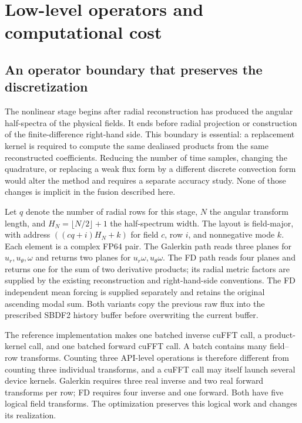 \section{Low-level operators and computational cost}
\label{sec:operators}

\subsection{An operator boundary that preserves the discretization}

The nonlinear stage begins after radial reconstruction has produced the angular half-spectra of the physical fields. It ends before radial projection or construction of the finite-difference right-hand side. This boundary is essential: a replacement kernel is required to compute the same dealiased products from the same reconstructed coefficients. Reducing the number of time samples, changing the quadrature, or replacing a weak flux form by a different discrete convection form would alter the method and requires a separate accuracy study. None of those changes is implicit in the fusion described here.

Let \(q\) denote the number of radial rows for this stage, \(N\) the angular transform length, and \(H_N=\lfloor N/2\rfloor+1\) the half-spectrum width. The layout is field-major, with address \(((c q+i)H_N+k)\) for field \(c\), row \(i\), and nonnegative mode \(k\). Each element is a complex FP64 pair. The Galerkin path reads three planes for \(u_r,u_\theta,\omega\) and returns two planes for \(u_r\omega,u_\theta\omega\). The FD path reads four planes and returns one for the sum of two derivative products; its radial metric factors are supplied by the existing reconstruction and right-hand-side conventions. The FD independent mean forcing is supplied separately and retains the original ascending modal sum. Both variants copy the previous raw flux into the prescribed SBDF2 history buffer before overwriting the current buffer.

The reference implementation makes one batched inverse cuFFT call, a product-kernel call, and one batched forward cuFFT call. A batch contains many field--row transforms. Counting three API-level operations is therefore different from counting three individual transforms, and a cuFFT call may itself launch several device kernels\cite{r11}. Galerkin requires three real inverse and two real forward transforms per row; FD requires four inverse and one forward. Both have five logical field transforms. The optimization preserves this logical work and changes its realization.

